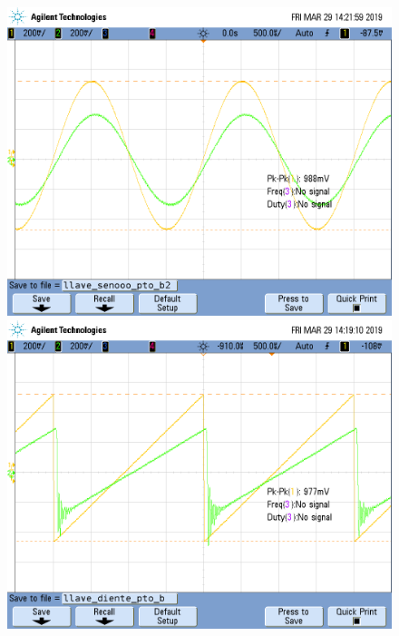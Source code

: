 \documentclass[../../ASSD_TP1_G7.tex]{subfiles}
\begin{document}
\begin{figure}[H]

\begin{centering}
\includegraphics[scale=0.25]{Imagenes/llave_senooo_pto_b2}\includegraphics[scale=0.25]{Imagenes/llave_diente_pto_b}
\par\end{centering}

\end{figure}
\end{document}
